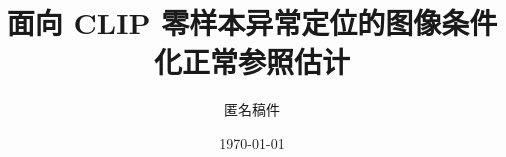 \documentclass[UTF8,11pt,fontset=none]{ctexart}
\title{面向 CLIP 零样本异常定位的图像条件化正常参照估计}
\author{匿名稿件}
\date{\today}
\begin{document}
\maketitle

\newcommand{\method}{ICNR}
\newcommand{\clipzsad}{CLIP-ZSAD}











{\small


}
\end{document}
